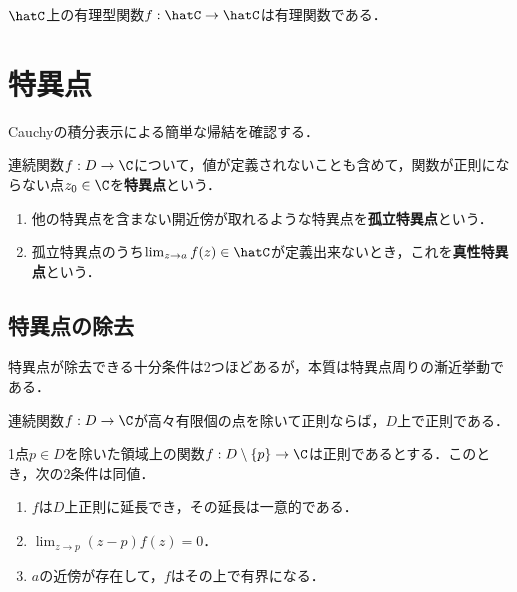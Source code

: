 \documentclass[uplatex, dvipdfmx]{jsreport}
\begin{document}
\begin{theorem}
    $\hatC$上の有理型関数$f:\hatC\to\hatC$は有理関数である．
\end{theorem}

\section{特異点}

\begin{tcolorbox}[colframe=ForestGreen, colback=ForestGreen!10!white,breakable,colbacktitle=ForestGreen!40!white,coltitle=black,fonttitle=\bfseries\sffamily,
title=]
    Cauchyの積分表示による簡単な帰結を確認する．
\end{tcolorbox}

\begin{definition}
    連続関数$f:D\to\C$について，値が定義されないことも含めて，関数が正則にならない点$z_0\in\C$を\textbf{特異点}という．
    \begin{enumerate}
        \item 他の特異点を含まない開近傍が取れるような特異点を\textbf{孤立特異点}という．
        \item 孤立特異点のうち$\lim_{z\to a}f(z)\in\hatC$が定義出来ないとき，これを\textbf{真性特異点}という．
    \end{enumerate}
\end{definition}

\subsection{特異点の除去}

\begin{tcolorbox}[colframe=ForestGreen, colback=ForestGreen!10!white,breakable,colbacktitle=ForestGreen!40!white,coltitle=black,fonttitle=\bfseries\sffamily,
title=]
    特異点が除去できる十分条件は2つほどあるが，本質は特異点周りの漸近挙動である．
\end{tcolorbox}

\begin{corollary}[連続性による除去]
    連続関数$f:D\to\C$が高々有限個の点を除いて正則ならば，$D$上で正則である．
\end{corollary}

\begin{corollary}
    1点$p\in D$を除いた領域上の関数$f:D\setminus\{p\}\to\C$は正則であるとする．このとき，次の2条件は同値．
    \begin{enumerate}
        \item $f$は$D$上正則に延長でき，その延長は一意的である．
        \item $\lim_{z\to p}(z-p)f(z)=0$．
        \item $a$の近傍が存在して，$f$はその上で有界になる．
    \end{enumerate}
\end{corollary}
\end{document}
